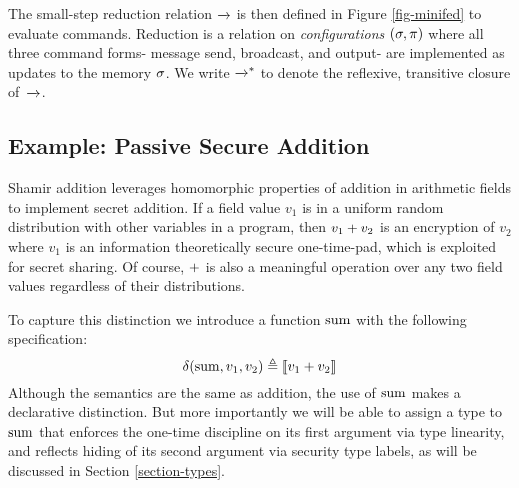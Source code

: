 The small-step reduction relation $\xrightarrow{}$ is then defined in Figure
\ref{fig-minifed} to evaluate commands. Reduction is a relation on
\emph{configurations} $(\sigma, \pi)$ where all three command forms-
message send, broadcast, and output- are implemented as updates to the
memory $\sigma$. We write $\xrightarrow{}^{*}$ to denote the reflexive, transitive
closure of\ $\xrightarrow{}$. 

\subsection{Example: Passive Secure Addition}

Shamir addition leverages homomorphic properties of addition in
arithmetic fields to implement secret addition. If a field value $v_1$
is in a uniform random distribution with other variables in a program,
then $v_1 + v_2$ is an encryption of $v_2$ where $v_1$ is an
information theoretically secure one-time-pad, which is exploited for
secret sharing. Of course, $+$ is also a meaningful operation
over any two field values regardless of their distributions.

To capture this distinction we introduce a function $\mathrm{sum}$
with the following specification:
$$
\delta(\mathrm{sum},v_1,v_2) \triangleq \llbracket v_1 + v_2 \rrbracket_{}
$$
Although the semantics are the same as addition, the use of $\mathrm{sum}$
makes a declarative distinction. But more importantly we will be
able to assign a type to $\mathrm{sum}$ that enforces the one-time discipline
on its first argument via type linearity, and reflects hiding of
its second argument via security type labels, as will be discussed in Section
\ref{section-types}.

